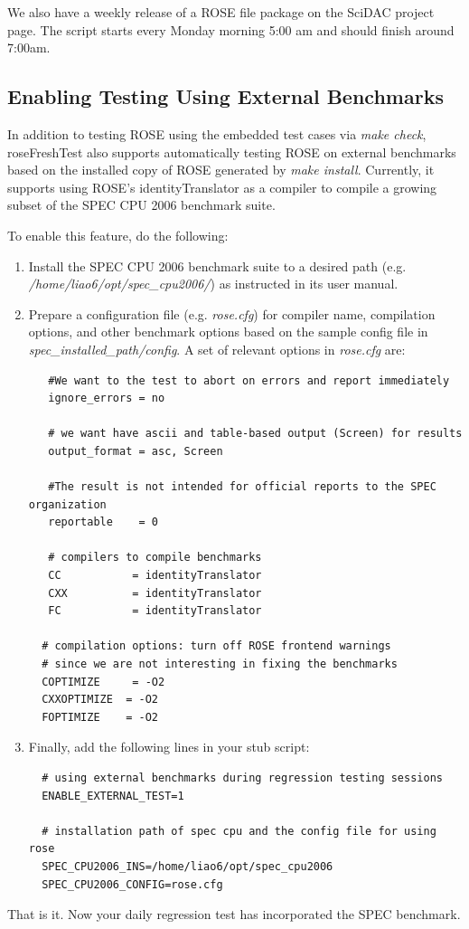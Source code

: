 We also have a weekly release of a ROSE file package on the SciDAC project page.
The script starts every Monday morning 5:00 am and should finish around 7:00am. 


\subsection{Enabling Testing Using External Benchmarks}
In addition to testing ROSE using the embedded test cases via \textit{make
check}, roseFreshTest also supports automatically testing ROSE on
external benchmarks based on the installed copy of ROSE generated by
\textit{make install}. 
Currently, it supports using ROSE's identityTranslator as a compiler to
compile a growing subset of the SPEC CPU 2006 benchmark suite. 

To enable this feature, do the following:
\begin{enumerate}
  \item Install the SPEC CPU 2006 benchmark suite to a desired path (e.g.
  \textit{/home/liao6/opt/spec\_cpu2006/}) as instructed in its user
  manual.
  \item Prepare a configuration file (e.g. \textit{rose.cfg}) for compiler name, compilation
  options, and other benchmark options based on the sample config file in
  \textit{spec\_installed\_path/config}. A set of relevant options in
  \textit{rose.cfg} are:
  \begin{verbatim}
   #We want to the test to abort on errors and report immediately
   ignore_errors = no

   # we want have ascii and table-based output (Screen) for results
   output_format = asc, Screen

   #The result is not intended for official reports to the SPEC organization
   reportable    = 0

   # compilers to compile benchmarks
   CC           = identityTranslator
   CXX          = identityTranslator
   FC           = identityTranslator

  # compilation options: turn off ROSE frontend warnings 
  # since we are not interesting in fixing the benchmarks
  COPTIMIZE     = -O2 
  CXXOPTIMIZE  = -O2 
  FOPTIMIZE    = -O2 
  \end{verbatim}
  \item Finally, add the following lines in your stub script:
  \begin{verbatim}
  # using external benchmarks during regression testing sessions
  ENABLE_EXTERNAL_TEST=1

  # installation path of spec cpu and the config file for using rose
  SPEC_CPU2006_INS=/home/liao6/opt/spec_cpu2006
  SPEC_CPU2006_CONFIG=rose.cfg
  \end{verbatim}
\end{enumerate}
That is it. Now your daily regression test has incorporated the SPEC
benchmark.

